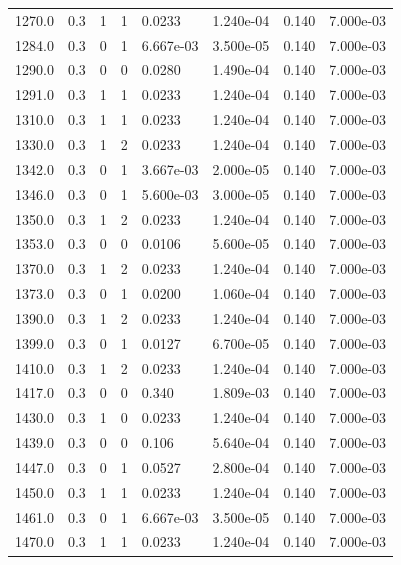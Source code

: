 \documentclass[preview]{standalone}
\begin{document}
{{{{\begin{tabular}{L{1.2cm}C{1.2cm} C{0.3cm}C{0.5cm} C{1.4cm}C{1.4cm} C{1.4cm}C{1.4cm}}
  1270.0  &   0.3  & 1     &  1 &  0.0233  & 1.240e-04  & 0.140 &  7.000e-03   \\ 
  1284.0  &   0.3  & 0     &  1 &  6.667e-03  & 3.500e-05  & 0.140 &  7.000e-03   \\ 
  1290.0  &   0.3  & 0     &  0 &  0.0280  & 1.490e-04  & 0.140 &  7.000e-03   \\ 
  1291.0  &   0.3  & 1     &  1 &  0.0233  & 1.240e-04  & 0.140 &  7.000e-03   \\ 
  1310.0  &   0.3  & 1     &  1 &  0.0233  & 1.240e-04  & 0.140 &  7.000e-03   \\ 
  1330.0  &   0.3  & 1     &  2 &  0.0233  & 1.240e-04  & 0.140 &  7.000e-03   \\ 
  1342.0  &   0.3  & 0     &  1 &  3.667e-03  & 2.000e-05  & 0.140 &  7.000e-03   \\ 
  1346.0  &   0.3  & 0     &  1 &  5.600e-03  & 3.000e-05  & 0.140 &  7.000e-03   \\ 
  1350.0  &   0.3  & 1     &  2 &  0.0233  & 1.240e-04  & 0.140 &  7.000e-03   \\ 
  1353.0  &   0.3  & 0     &  0 &  0.0106  & 5.600e-05  & 0.140 &  7.000e-03   \\ 
  1370.0  &   0.3  & 1     &  2 &  0.0233  & 1.240e-04  & 0.140 &  7.000e-03   \\ 
  1373.0  &   0.3  & 0     &  1 &  0.0200  & 1.060e-04  & 0.140 &  7.000e-03   \\ 
  1390.0  &   0.3  & 1     &  2 &  0.0233  & 1.240e-04  & 0.140 &  7.000e-03   \\ 
  1399.0  &   0.3  & 0     &  1 &  0.0127  & 6.700e-05  & 0.140 &  7.000e-03   \\ 
  1410.0  &   0.3  & 1     &  2 &  0.0233  & 1.240e-04  & 0.140 &  7.000e-03   \\ 
  1417.0  &   0.3  & 0     &  0 &  0.340  & 1.809e-03  & 0.140 &  7.000e-03   \\ 
  1430.0  &   0.3  & 1     &  0 &  0.0233  & 1.240e-04  & 0.140 &  7.000e-03   \\ 
  1439.0  &   0.3  & 0     &  0 &  0.106  & 5.640e-04  & 0.140 &  7.000e-03   \\ 
  1447.0  &   0.3  & 0     &  1 &  0.0527  & 2.800e-04  & 0.140 &  7.000e-03   \\ 
  1450.0  &   0.3  & 1     &  1 &  0.0233  & 1.240e-04  & 0.140 &  7.000e-03   \\ 
  1461.0  &   0.3  & 0     &  1 &  6.667e-03  & 3.500e-05  & 0.140 &  7.000e-03   \\ 
  1470.0  &   0.3  & 1     &  1 &  0.0233  & 1.240e-04  & 0.140 &  7.000e-03   \\ 

\end{tabular}}}}}
\end{document}
